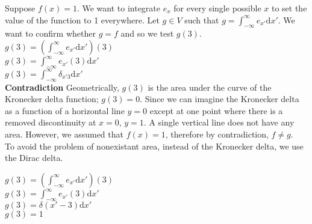 \documentclass[11pt]{article} %
\newenvironment{example}[1][Example]{\begin{trivlist}
\item[\hskip \labelsep {\bfseries #1}]}{\end{trivlist}}
\begin{document}
\begin{example}
Suppose $f(x) = 1$. We want to integrate $e_x$ for every single possible $x$ to set the value of the function to 1 everywhere. Let $g \in V$ such that $g = \int_{-\infty}^{\infty}{e_{x'}} \mathrm{d}x'$. We want to confirm whether $g = f$ and so we test $g(3)$. 
	{\center
		$g(3) = (\int_{-\infty}^{\infty}e_{x'} \mathrm{d}x')(3)$ \\
		$g(3) = \int_{-\infty}^{\infty}e_{x'}(3) \mathrm{d} x'$ \\
		$g(3) = \int_{-\infty}^{\infty}\delta_{x'3} \mathrm{d}x'$\\ 
	}
	\textbf{Contradiction} Geometrically, $g(3)$ is the area under the curve of the Kronecker delta function; $g(3) = 0$. Since we can imagine the Kronecker delta as a function of a horizontal line $y = 0$ except at one point where there is a removed discontinuity at $x = 0$, $y = 1$. A single vertical line does not have any area. However, we assumed that $f(x) = 1$, therefore by contradiction, $f \neq g$. \\ 	To avoid the problem of nonexistant area, instead of the Kronecker delta, we use the Dirac delta. 

	{\center
		$g(3) = (\int_{-\infty}^{\infty}e_{x'} \mathrm{d}x')(3)$ \\
		$g(3) = \int_{-\infty}^{\infty}e_{x'}(3) \mathrm{d} x'$ \\
		$g(3) = \delta(x' - 3) \mathrm{d}x' $ \\
		$g(3) = 1 $\\
	}
\end{example}
\end{document}
